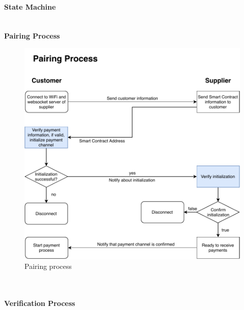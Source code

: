 \paragraph{State Machine}
\leavevmode
\\
\textbf{Pairing Process}\\
\begin{figure}[h]
    \includegraphics[width=\textwidth]{img/Plug-Socket-pairing_process.pdf}
    \caption{Pairing process}
    \label{fig:pairing_process}
\end{figure}
\\\\
\textbf{Verification Process}\\
